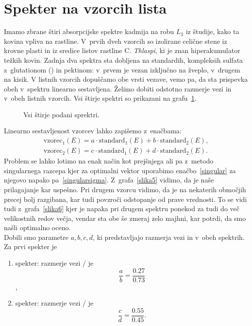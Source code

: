 \documentclass[a4paper,pdftex,12pt]{article}
\numberwithin{figure}{section} %
\begin{document}
\section{Spekter na vzorcih lista}
Imamo zbrane štiri absorpcijske spektre kadmija na robu $L_3$ iz študije, kako
ta kovina vpliva na rastline. V~prvih dveh vzorcih so izolirane celične stene iz krovne 
plasti in iz sredice listov rastline C. \emph{Thlaspi}, ki je znan hiperakumulator težkih 
kovin.  Zadnja dva spektra sta dobljena na standardih, kompleksih  sulfata 
z~glutationom () in pektinom: v~prvem je  vezan izključno na žveplo, 
v~drugem na kisik.  V listnih vzorcih dopuščamo obe vrsti vezave, vemo pa, da sta 
prispevka obeh v~spektru linearno sestavljena. Želimo dobiti odstotno razmerje vezi 
 in  v~obeh listnih vzorcih. Vsi štirje spektri so prikazani na 
grafu~\ref{slika4}.
\begin{figure}    
    \resizebox{0.98\linewidth}{!}{}
    \caption{Vsi štirje podani sprektri.}
    \label{slika4}
\end{figure}
Linearno sestavljenost vzorcev lahko zapišemo z~enačbama:
\begin{align}
    \mathrm{vzorec}_1(E) = a \cdot \mathrm{standard}_1 (E) 
    + b \cdot \mathrm{standard}_2 (E), \\
    \mathrm{vzorec}_2(E) = c \cdot \mathrm{standard}_1 (E) 
    + d \cdot \mathrm{standard}_2 (E).
\end{align}
Problem se lahko lotimo na enak način kot prejšnjega ali pa z~metodo singularnega razcepa
kjer za optimalni vektor uporabimo enačbo~\ref{singular} za njegovo napako 
pa~\ref{singularsigma}.
Z~grafa~\ref{slika5} vidimo, da je naše prilagajanje kar uspešno. Pri drugem vzorcu vidimo,
da je na nekaterih območjih precej bolj razgibana, kar tudi povzroči odstopanje od prave
vrednosti. To se vidi tudi z~grafa~\ref{slika6} kjer je napaka pri drugem spektru ponekod 
za tudi do več velikostnih redov večja, vendar sta obe še zmeraj zelo majhni, kar potrdi,
da smo našli optimalno oceno.\\
Dobili smo parametre $a,b,c,d$, ki predstavljajo razmerja vezi  in  
v~obeh spektrih. Za prvi spekter je
\begin{enumerate}
    \item spekter: razmerje vezi / je $$\frac{a}{b} = \frac{0.27}{0.73}$$,
    \item spekter: razmerje vezi / je $$\frac{c}{d} = \frac{0.55}{0.45}.$$
\end{enumerate}
\end{document}
